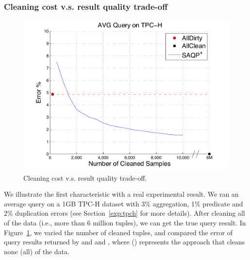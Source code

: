\subsubsection{Cleaning cost v.s. result quality trade-off}\label{subsubsec:trade-off}

\begin{figure}[tup]\centering
\includegraphics[scale=0.35]{figs/tradeoff-new.pdf}
\caption{Cleaning cost v.s. result quality trade-off.}
\label{fig:tradeoff}
\end{figure}

We illustrate the first characteristic with a real experimental result. We ran an average query on a 1GB \mbox{TPC-H} dataset with 3\% aggregation, 1\% predicate and 2\% duplication errors (see Section~\ref{exp:tpch} for more details). After cleaning all of the data (i.e., more than 6 million tuples), we can get the true query result. In Figure~\ref{fig:tradeoff}, we varied the number of cleaned tuples, and compared the error of query results returned by \saqpplus and \alldirty and \allclean, where \alldirty (\allclean) represents the approach that cleans none (all) of the data.


